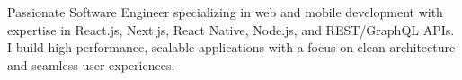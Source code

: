 

\begin{cvparagraph}

Passionate Software Engineer specializing in web and mobile development with expertise in React.js, Next.js, React Native, Node.js, and REST/GraphQL APIs. I build high-performance, scalable applications with a focus on clean architecture and seamless user experiences.
\end{cvparagraph}
